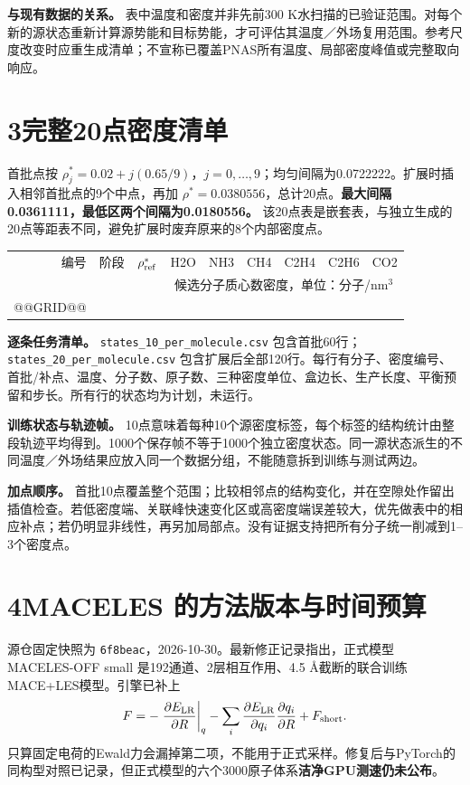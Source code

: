 \documentclass[a4paper]{ctexart}
\newcommand{\planned}{\textcolor{red!65!black}{计划，未运行}}
\begin{document}
\textbf{与现有数据的关系。} 表中温度和密度并非先前300 K水扫描的已验证范围。对每个新的源状态重新计算源势能和目标势能，才可评估其温度／外场复用范围。参考尺度改变时应重生成清单；不宣称已覆盖PNAS所有温度、局部密度峰值或完整取向响应。

\clearpage
\section*{3\quad 完整20点密度清单}
首批点按 $\rho_j^*=0.02+j(0.65/9)$，$j=0,\ldots,9$；均匀间隔为0.0722222。扩展时插入相邻首批点的9个中点，再加 $\rho^*=0.0380556$，总计20点。\textbf{最大间隔0.0361111，最低区两个间隔为0.0180556。} 该20点表是嵌套表，与独立生成的20点等距表不同，避免扩展时废弃原来的8个内部密度点。

\begin{center}\small\setlength{\tabcolsep}{4pt}
\begin{tabular}{rrr|rrrrrr}\toprule
编号 & 阶段 & $\rho^*_{\rm ref}$ & H2O & NH3 & CH4 & C2H4 & C2H6 & CO2\\
 & & & \multicolumn{6}{c}{候选分子质心数密度，单位：分子/nm$^3$}\\\midrule
@@GRID@@
\bottomrule\end{tabular}\end{center}

\textbf{逐条任务清单。} \texttt{states\_10\_per\_molecule.csv} 包含首批60行；\texttt{states\_20\_per\_molecule.csv} 包含扩展后全部120行。每行有分子、密度编号、首批/补点、温度、分子数、原子数、三种密度单位、盒边长、生产长度、平衡预留和步长。所有行的状态均为\planned。

\textbf{训练状态与轨迹帧。} 10点意味着每种10个源密度标签，每个标签的结构统计由整段轨迹平均得到。1000个保存帧不等于1000个独立密度状态。同一源状态派生的不同温度／外场结果应放入同一个数据分组，不能随意拆到训练与测试两边。

\textbf{加点顺序。} 首批10点覆盖整个范围；比较相邻点的结构变化，并在空隙处作留出插值检查。若低密度端、关联峰快速变化区或高密度端误差较大，优先做表中的相应补点；若仍明显非线性，再另加局部点。没有证据支持把所有分子统一削减到1--3个密度点。

\clearpage
\section*{4\quad MACELES 的方法版本与时间预算}
源仓固定快照为 \texttt{6f8beac}，2026-10-30。最新修正记录指出，正式模型 MACELES-OFF small 是192通道、2层相互作用、4.5 \AA{}截断的联合训练MACE+LES模型。引擎已补上
\[
F=-\left.\frac{\partial E_{\rm LR}}{\partial R}\right|_q
  -\sum_i\frac{\partial E_{\rm LR}}{\partial q_i}\frac{\partial q_i}{\partial R}
  +F_{\rm short}.
\]
只算固定电荷的Ewald力会漏掉第二项，不能用于正式采样。修复后与PyTorch的同构型对照已记录，但正式模型的六个3000原子体系\textbf{洁净GPU测速仍未公布}。
\end{document}
